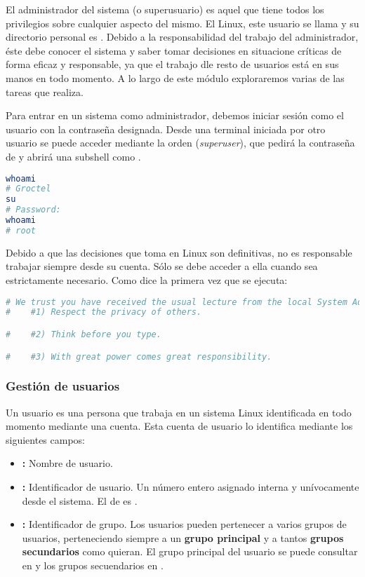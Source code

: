 El administrador del sistema (o superusuario) es aquel que tiene todos los privilegios sobre cualquier aspecto del mismo.
El Linux, este usuario se llama  y su directorio personal es .
Debido a la responsabilidad del trabajo del administrador, éste debe conocer el sistema y saber tomar decisiones en situacione críticas de forma eficaz y responsable, ya que el trabajo dle resto de usuarios está en sus manos en todo momento.
A lo largo de este módulo exploraremos varias de las tareas que realiza.

Para entrar en un sistema como administrador, debemos iniciar sesión como el usuario  con la contraseña designada.
Desde una terminal iniciada por otro usuario se puede acceder mediante la orden  (\emph{superuser}), que pedirá la contraseña de  y abrirá una subshell como .

\begin{lstlisting}[language=Bash]
whoami
# Groctel
su
# Password:
whoami
# root
\end{lstlisting}

Debido a que las decisiones que toma  en Linux son definitivas, no es responsable trabajar siempre desde su cuenta.
Sólo se debe acceder a ella cuando sea estrictamente necesario.
Como dice  la primera vez que se ejecuta:

\begin{lstlisting}[language=Bash]
# We trust you have received the usual lecture from the local System Administrator. It usually boils down to these three things:
#    #1) Respect the privacy of others.

#    #2) Think before you type.

#    #3) With great power comes great responsibility.
\end{lstlisting}

\subsubsection{Gestión de usuarios}

Un usuario es una persona que trabaja en un sistema Linux identificada en todo momento mediante una cuenta.
Esta cuenta de usuario lo identifica mediante los siguientes campos:

\begin{itemize}
	\item{}\textbf{:} Nombre de usuario.
	\item{}\textbf{:} Identificador de usuario. Un número entero asignado interna y unívocamente desde el sistema. El  de  es .
	\item{}\textbf{:} Identificador de grupo. Los usuarios pueden pertenecer a varios grupos de usuarios, perteneciendo siempre a un \textbf{grupo principal} y a tantos \textbf{grupos secundarios} como quieran. El grupo principal del usuario se puede consultar en  y los grupos secuendarios en .
\end{itemize}

